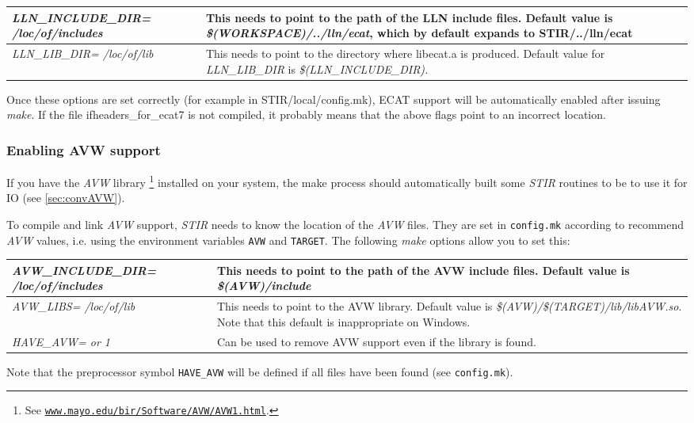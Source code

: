 \documentclass{article}
\def\R2Lurl#1#2{\mbox{\href{#1}{\tt #2}}}
\begin{document}
\begin{longtable}{|p{\MakeTableFirstCol}|p{\MakeTableSecondCol}|}
\hline
\raggedright
\textit{LLN\_INCLUDE\_DIR=\linebreak
/loc/of/includes} &
This needs to point to the path of the LLN include files. Default 
value is \textit{\$(WORKSPACE)/../lln/ecat}, which by default expands 
to \textbf{STIR/../lln/ecat}\\
\hline
{\raggedright \textit{LLN\_LIB\_DIR= \linebreak
/loc/of/lib}} & 
{\raggedright This needs to point to the directory where libecat.a is produced. 
Default value for \textit{LLN\_LIB\_DIR} is \textit{\$(LLN\_INCLUDE\_DIR).}} \\
\hline
\end{longtable}


Once these options are set correctly (for example in STIR/local/config.mk), 
ECAT support will be automatically enabled after issuing \textit{make}. 
If the file ifheaders\_for\_ecat7 is not compiled, it probably 
means that the above flags point to an incorrect location.

\subsubsection{
Enabling AVW support}
\label{sec:AVWsupport}
If you have the \textit{AVW}\texttrademark{}  library
\footnote{See \R2Lurl{http://www.mayo.edu/bir/Software/AVW/AVW1.html}
{www.mayo.edu/bir/Software/AVW/AVW1.html}.
} installed on your system, the make process should automatically built
some \textit{STIR} routines to be to use it for IO (see \ref{sec:convAVW}).

To compile and link \textit{AVW} support, \textit{STIR} needs to know the location 
of the \textit{AVW} files. 
They are set in \texttt{config.mk} according to recommend \textit{AVW} values,
i.e. using the environment variables \texttt{AVW} and \texttt{TARGET}.
The following \textit{make} options allow you 
to set this:

\begin{longtable}{|p{\MakeTableFirstCol}|p{\MakeTableSecondCol}|}
\hline
\raggedright
\textit{AVW\_INCLUDE\_DIR=\linebreak
/loc/of/includes} &
This needs to point to the path of the AVW include files. Default 
value is \textit{\$(AVW)/include}\\
\hline
{\raggedright \textit{AVW\_LIBS= \linebreak
/loc/of/lib}} & 
{\raggedright This needs to point to the AVW library.
Default value is \textit{\$(AVW)/\$(TARGET)/lib/libAVW.so}.
Note that this default is inappropriate on Windows.} \\
\hline
{\raggedright \textit{HAVE\_AVW= \linebreak
0 or 1}} & 
Can be used to remove AVW support even if the library is found.\\
\hline
\end{longtable}
Note that the preprocessor symbol \texttt{HAVE\_AVW} will be defined 
if all files have been found (see \texttt{config.mk}).
\end{document}
